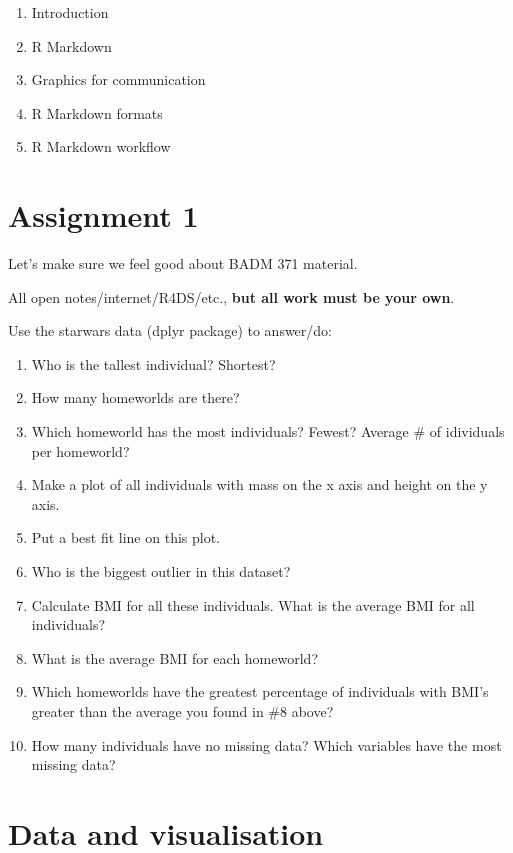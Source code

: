 \documentclass[
]{book}
\providecommand{\tightlist}{%
  \setlength{\itemsep}{0pt}\setlength{\parskip}{0pt}}
\theoremstyle{definition}
\theoremstyle{definition}
\theoremstyle{definition}
\theoremstyle{definition}
\theoremstyle{remark}
\begin{document}
\begin{enumerate}
\def\labelenumi{\arabic{enumi})}
\setcounter{enumi}{25}
\tightlist
\item
  Introduction
\item
  R Markdown
\item
  Graphics for communication
\item
  R Markdown formats
\item
  R Markdown workflow
\end{enumerate}

\hypertarget{assignment-1}{%
\chapter{Assignment 1}\label{assignment-1}}

Let's make sure we feel good about BADM 371 material.

All open notes/internet/R4DS/etc., \textbf{but all work must be your own}.

Use the starwars data (dplyr package) to answer/do:

\begin{enumerate}
\def\labelenumi{\arabic{enumi}.}
\tightlist
\item
  Who is the tallest individual? Shortest?
\item
  How many homeworlds are there?
\item
  Which homeworld has the most individuals? Fewest? Average \# of idividuals per homeworld?
\item
  Make a plot of all individuals with mass on the x axis and height on the y axis.
\item
  Put a best fit line on this plot.
\item
  Who is the biggest outlier in this dataset?
\item
  Calculate BMI for all these individuals. What is the average BMI for all individuals?
\item
  What is the average BMI for each homeworld?
\item
  Which homeworlds have the greatest percentage of individuals with BMI's greater than the average you found in \#8 above?
\item
  How many individuals have no missing data? Which variables have the most missing data?
\end{enumerate}

\hypertarget{data-and-visualisation}{%
\chapter{Data and visualisation}\label{data-and-visualisation}}
\end{document}
